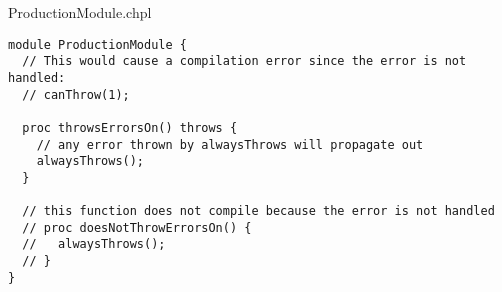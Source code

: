 \begin{chapelexample}{ProductionModule.chpl}
\begin{chapel}
\begin{verbatim}
module ProductionModule {
  // This would cause a compilation error since the error is not handled:
  // canThrow(1);

  proc throwsErrorsOn() throws {
    // any error thrown by alwaysThrows will propagate out
    alwaysThrows();
  }

  // this function does not compile because the error is not handled
  // proc doesNotThrowErrorsOn() {
  //   alwaysThrows();
  // }
}
\end{verbatim}
\end{chapel}
\end{chapelexample}
